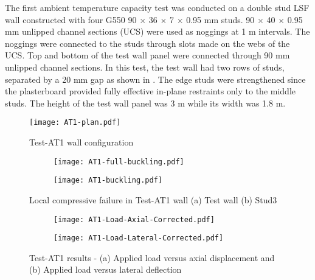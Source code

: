 The first ambient temperature capacity test was conducted on a double stud LSF wall constructed with four G550 90 $\times$ 36 $\times$ 7 $\times$ 0.95 mm studs. 90 $\times$ 40 $\times$ 0.95 mm unlipped channel sections (UCS) were used as noggings at 1 m intervals. The noggings were connected to the studs through slots made on the webs of the UCS. Top and bottom of the test wall panel were connected through 90 mm unlipped channel sections. In this test, the test wall had two rows of studs, separated by a 20 mm gap as shown in . The edge studs were strengthened since the plasterboard provided fully effective in-plane restraints only to the middle studs. The height of the test wall panel was 3 m while its width was 1.8 m.
\begin{figure}[!htbp]
	\centering
			\texttt{[image: AT1-plan.pdf]}\\
		\caption{Test-AT1 wall configuration}
		\label{fig:AT1-plan}
\end{figure} 
\begin{figure}[!htbp]
	\centering
	\begin{subfigure}[b]{0.4\textwidth}
		\centering
		\texttt{[image: AT1-full-buckling.pdf]}
		\caption{}
		\label{subfig:AT1-full-buckling}
	\end{subfigure}
	\begin{subfigure}[b]{0.4\textwidth}
		\centering
		\texttt{[image: AT1-buckling.pdf]}
		\caption{}
		\label{subfig:AT1-buckling}
	\end{subfigure}
	   \caption{Local compressive failure in Test-AT1 wall (a) Test wall (b) Stud3}
	   \label{fig:AT1-failure}
\end{figure}
\begin{figure}[!htbp]
	\centering
	\begin{subfigure}[b]{0.7\textwidth}
		\centering
		\texttt{[image: AT1-Load-Axial-Corrected.pdf]}
		\caption{}
		\label{subfig:AT1-Load-Axial-Corrected}
	\end{subfigure}
	\begin{subfigure}[b]{0.7\textwidth}
		\centering
		\texttt{[image: AT1-Load-Lateral-Corrected.pdf]}
		\caption{}
		\label{subfig:AT1-Load-Lateral-Corrected}
	\end{subfigure}
	   \caption{Test-AT1 results - (a) Applied load versus axial displacement and (b) Applied load versus lateral deflection}
	   \label{fig:AT1-results}
\end{figure}

